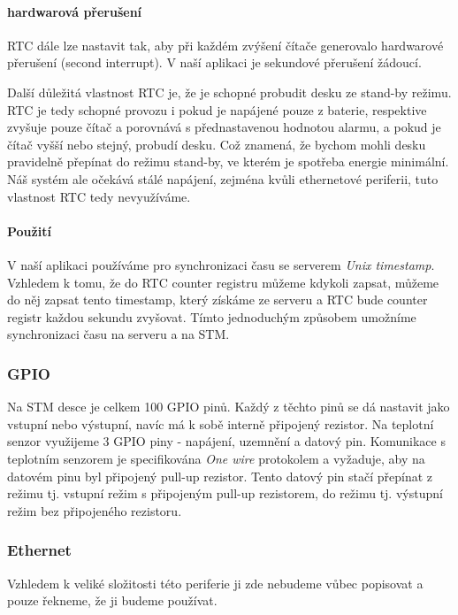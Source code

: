 \paragraph{hardwarová přerušení}
RTC dále lze nastavit tak, aby při každém zvýšení čítače generovalo hardwarové
přerušení (second interrupt).
V naší aplikaci je sekundové přerušení žádoucí.

Další důležitá vlastnost RTC je, že je schopné probudit desku ze stand-by režimu.
RTC je tedy schopné provozu i pokud je napájené pouze z baterie, respektive
zvyšuje pouze čítač a porovnává s přednastavenou hodnotou alarmu, a pokud je
čítač vyšší nebo stejný, probudí desku.
Což znamená, že bychom mohli desku pravidelně přepínat do režimu stand-by, ve
kterém je spotřeba energie minimální.
Náš systém ale očekává stálé napájení, zejména kvůli ethernetové periferii,
tuto vlastnost RTC tedy nevyužíváme.

\paragraph{Použití}
V naší aplikaci používáme pro synchronizaci času se serverem \emph{Unix timestamp}.
Vzhledem k tomu, že do RTC counter registru můžeme kdykoli zapsat, můžeme do něj zapsat tento timestamp, který
získáme ze serveru a RTC bude counter registr každou sekundu zvyšovat.
Tímto jednoduchým způsobem umožníme synchronizaci času na serveru a na STM.

\subsubsection{GPIO}
Na STM desce je celkem 100 GPIO pinů.
Každý z těchto pinů se dá nastavit jako vstupní nebo výstupní, navíc má k sobě interně připojený
rezistor.
Na teplotní senzor využijeme 3 GPIO piny - napájení, uzemnění a datový pin.
Komunikace s teplotním senzorem je specifikována \emph{One wire} protokolem a vyžaduje, aby na
datovém pinu byl připojený pull-up rezistor.
Tento datový pin stačí přepínat z režimu  tj. vstupní režim s připojeným pull-up
rezistorem, do režimu  tj. výstupní režim bez připojeného rezistoru.

\subsubsection{Ethernet}
Vzhledem k veliké složitosti této periferie ji zde nebudeme vůbec popisovat a pouze řekneme, že ji
budeme používat.
